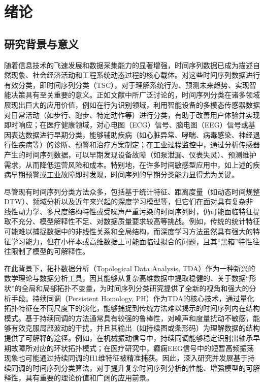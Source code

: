 \section{绪论}
\subsection{研究背景与意义}
随着信息技术的飞速发展和数据采集能力的显著增强，时间序列数据已成为描述自然现象、社会经济活动和工程系统动态过程的核心载体。对这些时间序列数据进行有效分类，即时间序列分类（TSC），对于理解系统行为、预测未来趋势、实现智能决策具有至关重要的意义。正如文献中所广泛讨论的，时间序列分类在诸多领域展现出巨大的应用价值，例如在行为识别领域，利用智能设备的多模态传感器数据对日常活动（如步行、跑步、特定动作等）进行分类，有助于改善用户体验并实现即时响应\cite{JSJC202406009}；在医疗健康领域，对心电图（ECG）信号、脑电图（EEG）信号或基因表达数据进行早期分类，能够辅助疾病（如心脏异常、哮喘、病毒感染、神经退行性疾病等）的诊断、预警和治疗方案制定\cite{1021736289.nh, mittal2017topological}；在工业过程监控中，通过分析传感器产生的时间序列数据，可以早期发现设备故障（如泵泄漏、仪表失灵）、预测维护需求，从而降低运营风险和成本\cite{perea2015sliding,JSJZ202112028}。特别地，在许多时间敏感型应用中，如上述的疾病早期预警或工业故障即时发现，时间序列的早期分类能力显得尤为关键。

尽管现有时间序列分类方法众多，包括基于统计特征、距离度量（如动态时间规整DTW）、频域分析以及近年来兴起的深度学习模型等，但它们在面对具有复杂非线性动力学、多尺度结构特性或受噪声严重污染的时间序列时，仍可能面临特征提取不充分、模型解释性不足、对数据质量要求较高等挑战。例如，传统的统计特征可能难以捕捉数据中的非线性关系和全局结构，而深度学习方法虽然具有强大的特征学习能力，但在小样本或高维数据上可能面临过拟合的问题，且其“黑箱”特性往往限制了模型的可解释性。\cite{1021585745.nh}

在此背景下，拓扑数据分析（Topological Data Analysis, TDA）作为一种新兴的数学理论与数据分析工具，因其能够从复杂高维数据中提取稳健的、关于数据“形状”的全局和局部拓扑不变量，为时间序列分类研究提供了全新的视角和强大的分析手段。持续同调（Persistent Homology, PH）作为TDA的核心技术，通过量化拓扑特征在不同尺度下的演化，能够捕捉到传统方法难以揭示的时间序列内在结构模式。基于持续同调的方法通常具有较强的鲁棒性，对噪声和度量扰动不敏感，能够有效克服局部波动的干扰，并且其输出（如持续图或条形码）为理解数据的结构提供了可解释的途径。例如，在机械振动信号中，持续同调能够稳定识别出轴承早期故障所对应的环状拓扑模式；在医疗研究中，癫痫EEG信号中的短暂高频振荡现象也可能通过持续同调的H1维特征被精准捕获。因此，深入研究并发展基于持续同调的时间序列分类算法，对于提升复杂时间序列分析的性能、增强模型的可解释性，具有重要的理论价值和广阔的应用前景。

